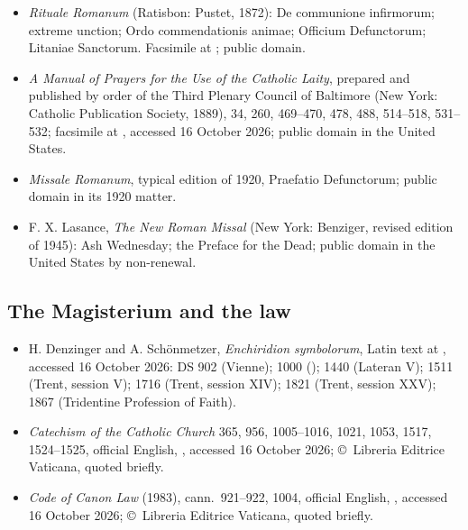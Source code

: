 {\fontsize{8.6}{9.6}\selectfont
\begin{itemize}[itemsep=0pt,parsep=0pt,topsep=0.05em]
\item \emph{Rituale Romanum} (Ratisbon: Pustet, 1872): De communione infirmorum; extreme unction; Ordo commendationis animae; Officium Defunctorum; Litaniae Sanctorum. Facsimile at ; public domain.
\item \emph{A Manual of Prayers for the Use of the Catholic Laity}, prepared and published by order of the Third Plenary Council of Baltimore (New York: Catholic Publication Society, 1889), 34, 260, 469--470, 478, 488, 514--518, 531--532; facsimile at , accessed 16 October 2026; public domain in the United States.
\item \emph{Missale Romanum}, typical edition of 1920, Praefatio Defunctorum; public domain in its 1920 matter.
\item F. X. Lasance, \emph{The New Roman Missal} (New York: Benziger, revised edition of 1945): Ash Wednesday; the Preface for the Dead; public domain in the United States by non-renewal.
\end{itemize}}

\subsection*{The Magisterium and the law}

{\fontsize{8.6}{9.6}\selectfont
\begin{itemize}[itemsep=0pt,parsep=0pt,topsep=0.05em]
\item H. Denzinger and A. Sch\"onmetzer, \emph{Enchiridion symbolorum}, Latin text at , accessed 16 October 2026: DS 902 (Vienne); 1000 (); 1440 (Lateran V); 1511 (Trent, session V); 1716 (Trent, session XIV); 1821 (Trent, session XXV); 1867 (Tridentine Profession of Faith).
\item \emph{Catechism of the Catholic Church} 365, 956, 1005--1016, 1021, 1053, 1517, 1524--1525, official English, , accessed 16 October 2026; \copyright\ Libreria Editrice Vaticana, quoted briefly.
\item \emph{Code of Canon Law} (1983), cann.~921--922, 1004, official English, , accessed 16 October 2026; \copyright\ Libreria Editrice Vaticana, quoted briefly.
\end{itemize}}

\endgroup
